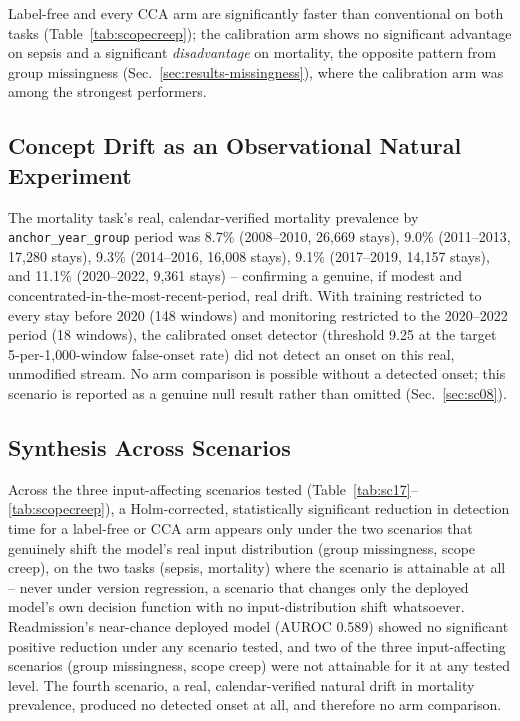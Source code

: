 \documentclass[preprintsapa,article,submit,oneauthor]{Definitions/mdpi}
\begin{document}
Label-free and every CCA arm are significantly faster than conventional on both tasks (Table~\ref{tab:scopecreep}); the calibration arm shows no significant advantage on sepsis and a significant \emph{disadvantage} on mortality, the opposite pattern from group missingness (Sec.~\ref{sec:results-missingness}), where the calibration arm was among the strongest performers.

\subsection{Concept Drift as an Observational Natural Experiment}

The mortality task's real, calendar-verified mortality prevalence by \texttt{anchor\_year\_group} period was 8.7\% (2008--2010, 26{,}669 stays), 9.0\% (2011--2013, 17{,}280 stays), 9.3\% (2014--2016, 16{,}008 stays), 9.1\% (2017--2019, 14{,}157 stays), and 11.1\% (2020--2022, 9{,}361 stays) -- confirming a genuine, if modest and concentrated-in-the-most-recent-period, real drift. With training restricted to every stay before 2020 (148 windows) and monitoring restricted to the 2020--2022 period (18 windows), the calibrated onset detector (threshold 9.25 at the target 5-per-1{,}000-window false-onset rate) did not detect an onset on this real, unmodified stream. No arm comparison is possible without a detected onset; this scenario is reported as a genuine null result rather than omitted (Sec.~\ref{sec:sc08}).

\subsection{Synthesis Across Scenarios}\label{sec:synthesis}

Across the three input-affecting scenarios tested (Table~\ref{tab:sc17}--\ref{tab:scopecreep}), a Holm-corrected, statistically significant reduction in detection time for a label-free or CCA arm appears only under the two scenarios that genuinely shift the model's real input distribution (group missingness, scope creep), on the two tasks (sepsis, mortality) where the scenario is attainable at all -- never under version regression, a scenario that changes only the deployed model's own decision function with no input-distribution shift whatsoever. Readmission's near-chance deployed model (AUROC 0.589) showed no significant positive reduction under any scenario tested, and two of the three input-affecting scenarios (group missingness, scope creep) were not attainable for it at any tested level. The fourth scenario, a real, calendar-verified natural drift in mortality prevalence, produced no detected onset at all, and therefore no arm comparison.
\end{document}
